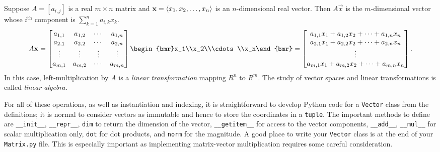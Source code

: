 \documentclass[m3380-lec-main.tex]{subfiles}
\begin{document}
\begin{defn} Suppose $A=[a_{i,j}]$ is a real $m\times n$ matrix and $\mathbf{x}=\left\langle x_1,x_2,\ldots,x_n\right\rangle$ is an $n$-dimensional real vector. Then $A\vec{x}$ is the $m$-dimensional vector whose $i^\text{th}$ component is $\sum_{k=1}^n a_{i,k}x_k$.
\[A\vec{x} = 
\begin{bmatrix}
a_{1,1} & a_{1,2} & \cdots & a_{1,n} \\
a_{2,1} & a_{2,2} & \cdots & a_{2,n} \\
\vdots & \vdots & \vdots & \vdots \\
a_{m,1} & a_{m,2} & \cdots & a_{m,n}
\end{bmatrix}
\begin{bmr}x_1\\x_2\\\cdots\\x_n\end{bmr} = 
\begin{bmatrix}
a_{1,1}x_1+a_{1,2}x_2+\cdots+a_{1,n}x_n \\
a_{2,1}x_1+a_{2,2}x_2+\cdots+a_{2,n}x_n \\ 
\vdots \\
a_{m,1}x_1+a_{m,2}x_2+\cdots+a_{m,n}x_n
\end{bmatrix}.\] 
In this case, left-multiplication by $A$ is a \emph{linear transformation} mapping $R^n$ to $R^m$. The study of vector spaces and linear transformations is called \emph{linear algebra.}
\end{defn}


For all of these operations, as well as instantiation and indexing, it is straightforward to develop Python code for a \verb|Vector| class from the definitions; it is normal to consider vectors as immutable and hence to store the coordinates in a \verb|tuple|. The important methods to define are \verb|__init__|,  \verb|__repr__|, \verb|dim| to return the dimension of the vector, \verb|__getitem__| for access to the vector components, \verb|__add__|, \verb|__mul__| for scalar multiplication only, \verb|dot| for dot products, and \verb|norm| for the magnitude. A good place to write your \verb|Vector| class is at the end of your \verb|Matrix.py| file. This is especially important as implementing matrix-vector multiplication requires some careful consideration.
\end{document}
